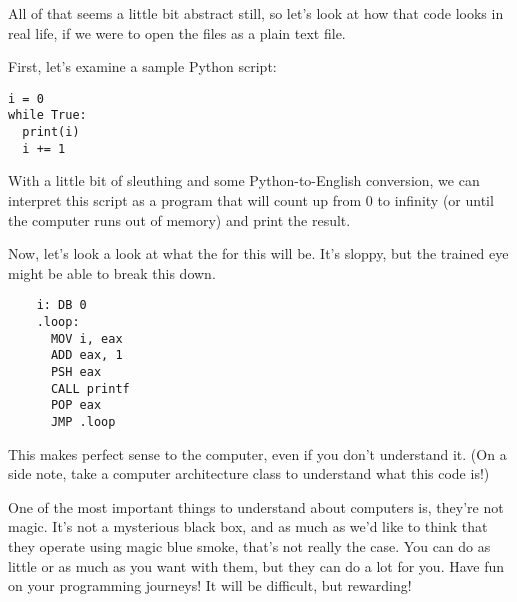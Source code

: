 All of that seems a little bit abstract still, so let’s look at how that code looks in real life, if we were to open the files as a plain text file.\par
First, let’s examine a sample Python script:\par
\begin{lstlisting}[style=pippython]
i = 0
while True:
  print(i)
  i += 1
\end{lstlisting}
With a little bit of sleuthing and some Python-to-English conversion, we can interpret this script as a program that will count up from 0 to infinity (or until the computer runs out of memory) and print the result.\par
Now, let's look a look at what the  for this will be. It's sloppy, but the trained eye might be able to break this down.\par
\begin{lstlisting}
    i: DB 0
    .loop:
      MOV i, eax
      ADD eax, 1
      PSH eax
      CALL printf
      POP eax
      JMP .loop
\end{lstlisting}
This makes perfect sense to the computer, even if you don't understand it. (On a side note, take a computer architecture class to understand what this code is!)\par
{}
One of the most important things to understand about computers is, they're not magic. It's not a mysterious black box, and as much as we'd like to think that they operate using magic blue smoke, that's not really the case. You can do as little or as much as you want with them, but they can do a lot for you. Have fun on your programming journeys! It will be difficult, but rewarding!
